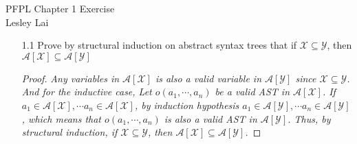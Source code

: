 \documentclass[12pt]{article}
\begin{document}
PFPL \hfill Chapter 1 Exercise\\
Lesley Lai

\hrulefill

\begin{enumerate}
\item[1.1] Prove by structural induction on abstract syntax trees that if $\mathcal{X} \subseteq \mathcal{Y}$, then $\mathcal{A}[\mathcal{X}] \subseteq \mathcal{A}[\mathcal{Y}]$\\


\begin{proof}

\textit{Any variables in $\mathcal{A}[\mathcal{X}]$ is also a valid variable in $\mathcal{A}[\mathcal{Y}]$ since $\mathcal{X} \subseteq \mathcal{Y}$. And for the inductive case, Let $o(a_1, \cdots, a_n)$ be a valid AST in $\mathcal{A}[\mathcal{X}]$. If $a_1 \in \mathcal{A}[\mathcal{X}], \cdots a_n \in \mathcal{A}[\mathcal{X}]$, by induction hypothesis $a_1 \in \mathcal{A}[\mathcal{Y}], \cdots a_n \in \mathcal{A}[\mathcal{Y}]$, which means that $o(a_1, \cdots, a_n)$ is also a valid AST in $\mathcal{A}[\mathcal{Y}]$. Thus, by structural induction, if $\mathcal{X} \subseteq \mathcal{Y}$, then $\mathcal{A}[\mathcal{X}] \subseteq \mathcal{A}[\mathcal{Y}]$.}

\end{proof}


\end{enumerate}
\end{document}
